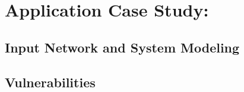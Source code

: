 

\section{Application Case Study:}\label{subsec:approach:main}





\subsection{Input Network and System Modeling}\label{subsec:approach:model}




\subsection{Vulnerabilities}\label{subsec:approach:vulns}

